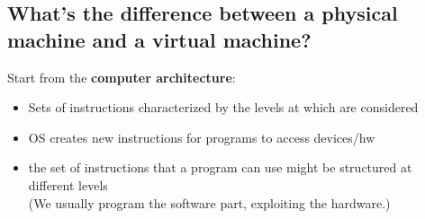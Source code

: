 \documentclass[10pt, oneside]{article}
\begin{document}
\subsection*{What’s the difference between a physical machine and a virtual machine?}
Start from the {\bf computer architecture}: 
\begin{itemize}
    \item Sets of instructions characterized by
    the levels at which are considered
    \item OS creates new instructions for programs to access devices/hw
    \item the set of instructions that a program can use might be structured at different levels\\ (We usually program the software part, exploiting the hardware.)
\end{itemize}
\end{document}
